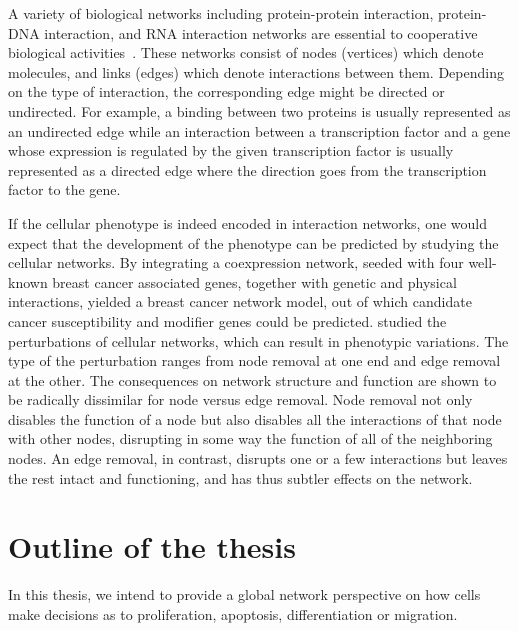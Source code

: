 
A variety of biological networks including protein-protein interaction, protein-DNA interaction, and RNA interaction networks are essential to cooperative biological activities~\citep{Zhu2007a}. These networks consist of nodes (vertices) which denote molecules, and links (edges) which denote interactions between them. Depending on the type of interaction, the corresponding edge might be directed or undirected. For example, a binding between two proteins is usually represented as an undirected edge while an interaction between a transcription factor and a gene whose expression is regulated by the given transcription factor is usually represented as a directed edge where the direction goes from the transcription factor to the gene.

If the cellular phenotype is indeed encoded in interaction 
networks, one would expect that the development of the
phenotype can be predicted by studying the cellular
networks. By integrating a coexpression network, seeded with four well-known breast cancer
associated genes, together with genetic and physical interactions, \cite{Pujana2007} yielded a breast cancer network model, out of which candidate cancer susceptibility and modifier genes could be predicted.
\cite{Zhong2009} studied the
perturbations of cellular networks, which can result in phenotypic variations.
The type of the perturbation ranges from node removal at one end and edge removal at the other. The
consequences on network structure and function are shown
to be radically dissimilar for node versus edge removal. Node removal not only disables the function of a node but
also disables all the interactions of that node with other nodes,
disrupting in some way the function of all of the neighboring nodes. An edge removal, in contrast, disrupts one or a few interactions
but leaves the rest intact and functioning, and has thus 
subtler effects
on the network. 

\section{Outline of the thesis}
In this thesis, we intend to provide a global network
perspective on how cells make decisions as to proliferation,
apoptosis, differentiation or migration.


